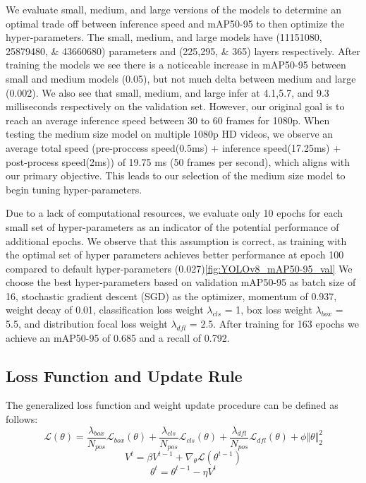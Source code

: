 \documentclass[10pt,twocolumn,letterpaper]{article}
\begin{document}
We evaluate small, medium, and large versions of the models to determine an optimal trade off between inference speed and mAP50-95 to then optimize the hyper-parameters. The small, medium, and large models have (11151080, 25879480, \& 43660680) parameters and (225,295, \& 365) layers respectively. After training the models we see there is a noticeable increase in mAP50-95 between small and medium models (0.05), but not much delta between medium and large (0.002). We also see that small, medium, and large infer at 4.1,5.7, and 9.3 milliseconds respectively on the validation set. However, our original goal is to reach an average inference speed between 30 to 60 frames for 1080p. When testing the medium size model on multiple 1080p HD videos, we observe an average total speed (pre-proccess speed(0.5ms) + inference speed(17.25ms) + post-process speed(2ms)) of 19.75 ms (50 frames per second), which aligns with our primary objective. This leads to our selection of the medium size model to begin tuning hyper-parameters.

Due to a lack of computational resources, we evaluate only 10 epochs for each small set of hyper-parameters as an indicator of the potential performance of additional epochs. We observe that this assumption is correct, as training with the optimal set of hyper parameters achieves better performance at epoch 100 compared to default hyper-parameters (0.027)\ref{fig:YOLOv8_mAP50-95_val} We choose the best hyper-parameters based on validation mAP50-95 as batch size of 16, stochastic gradient descent (SGD) as the optimizer, momentum of 0.937, weight decay of 0.01, classification loss weight $\lambda_{cls}$ = 1, box loss weight $\lambda_{box}$ = 5.5, and distribution focal loss weight $\lambda_{dfl}$ = 2.5. After training for 163 epochs we achieve an mAP50-95 of 0.685 and a recall of 0.792.

\subsection{Loss Function and Update Rule}
The generalized loss function and weight update procedure can be defined as follows: 
\begin{equation}\label{Generalized Loss}
\mathcal{L}(\theta) = \dfrac{\lambda_{box}}{N_{pos}}\mathcal{L}_{box}(\theta) + \dfrac{\lambda_{cls}}{N_{pos}}\mathcal{L}_{cls}(\theta) + \dfrac{\lambda_{dfl}}{N_{pos}}\mathcal{L}_{dfl}(\theta) + \phi\Vert \theta \Vert_2^2
\end{equation}    
\begin{equation}\label{Velocity}
V^t = \beta V^{t-1} + \nabla_{\theta}\mathcal{L}(\theta^{t-1})
\end{equation}    
\begin{equation}\label{Weight Update}
\theta^{t} = \theta^{t-1} - \eta V^{t}
\end{equation}
\end{document}
